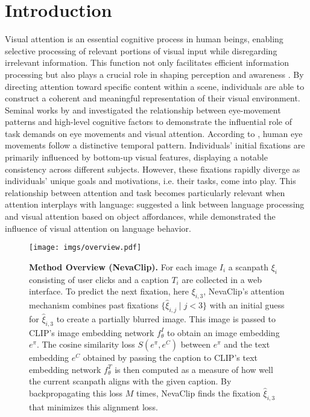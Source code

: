 \documentclass{article}
\begin{document}
\section{Introduction}
Visual attention is an essential cognitive process in human beings, enabling selective processing of relevant portions of visual input while disregarding irrelevant information. This function not only facilitates efficient  information processing but also plays a crucial role in shaping perception and awareness \citep{kietzmann2011overt, macknik2009role}. By directing attention toward specific content within a scene, individuals are able to construct a coherent and meaningful representation of their visual environment. Seminal works by \citet{buswell1935people} and \citet{tatler2010yarbus} investigated the relationship between eye-movement patterns and high-level cognitive factors to demonstrate the influential role of task demands on eye movements and visual attention. According to \citet{tatler2005visual}, human eye movements follow a distinctive temporal pattern. Individuals' initial fixations are primarily influenced by bottom-up visual features, displaying a notable consistency across different subjects. However, these fixations rapidly diverge as individuals' unique goals and motivations, i.e. their tasks, come into play. This relationship between attention and task becomes particularly relevant when attention interplays with language: \citet{altmann2007real} suggested a link between language processing and visual attention based on object affordances, while \citet{mishra2009interaction} demonstrated the influence of visual attention on language behavior.



\begin{figure}[t]
    \centering
    \texttt{[image: imgs/overview.pdf]}
    \caption{\textbf{Method Overview (NevaClip).} For each image $I_i$ a scanpath $\xi_i$ consisting of user clicks and a caption $T_i$ are collected in a web interface. To predict the next fixation, here $\xi_{i,3}$, NevaClip's attention mechanism combines past fixations $\{\hat{\xi}_{i,j} \mid j < 3\}$ with an initial guess for $\hat{\xi}_{i,3}$ to create a partially blurred image. This image is passed to CLIP's image embedding network $f_\theta^I$ to obtain an image embedding $e^\pi$. The cosine similarity loss $S(e^\pi,e^C)$ between $e^\pi$ and the text embedding $e^C$ obtained by passing the caption to CLIP's text embedding network $f_\theta^T$ is then computed as a measure of how well the current scanpath aligns with the given caption. By backpropagating this loss $M$ times, NevaClip finds the fixation $\hat{\xi}_{i,3}$ that minimizes this alignment loss.}
    \label{fig:overview}
\end{figure}
\end{document}
